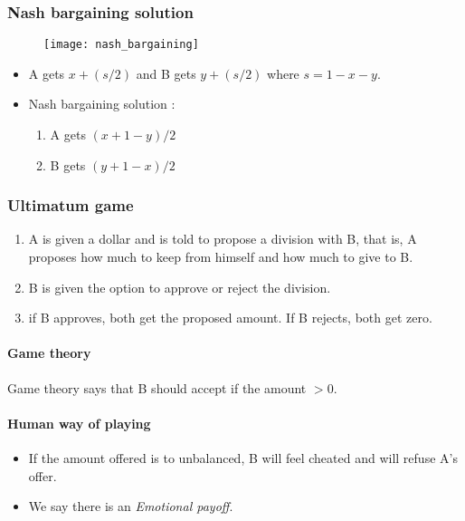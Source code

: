 \subsubsection{Nash bargaining solution}

\begin{figure}[H]
    \centering
    \texttt{[image: nash\_bargaining]}
\end{figure}

\begin{itemize}
\item A gets $x + (s/2)$ and B gets $y + (s/2)$ where $s = 1 - x - y$.
\item Nash bargaining solution :
	\begin{enumerate}
	\item A gets $(x + 1 - y)/2$
	\item B gets $(y + 1 - x)/2$
	\end{enumerate}
\end{itemize}

\subsubsection{Ultimatum game}

\begin{enumerate}
\item A is given a dollar and is told to propose a division with B, that is, A proposes how much to keep from himself and how much to give to B.
\item B is given the option to approve or reject the division.
\item if B approves, both get the proposed amount. If B rejects, both get zero.
\end{enumerate}

\paragraph{Game theory}

Game theory says that B should accept if the amount $> 0$.

\paragraph{Human way of playing}

\begin{itemize}
\item If the amount offered is to unbalanced, B will feel cheated and will refuse A's offer.
\item We say there is an \textit{Emotional payoff}.
\end{itemize}

